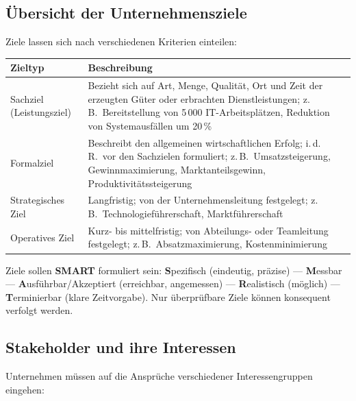 \documentclass[11pt, a4paper]{article}
\begin{document}
\subsection{Übersicht der Unternehmensziele}

Ziele lassen sich nach verschiedenen Kriterien einteilen:

\begin{center}
\begin{tabular}{p{3.5cm} p{9.5cm}}
\toprule
\textbf{Zieltyp} & \textbf{Beschreibung}\\
\midrule
Sachziel (Leistungsziel) & Bezieht sich auf Art, Menge, Qualität, Ort und Zeit der erzeugten
Güter oder erbrachten Dienstleistungen; z.\,B.\ Bereitstellung von
5\,000 IT-Arbeitsplätzen, Reduktion von Systemausfällen um 20\,\%\\
\addlinespace
Formalziel & Beschreibt den allgemeinen wirtschaftlichen Erfolg; i.\,d.\,R.\ vor den
Sachzielen formuliert; z.\,B.\ Umsatzsteigerung, Gewinnmaximierung,
Marktanteilsgewinn, Produktivitätssteigerung\\
\addlinespace
Strategisches Ziel & Langfristig; von der Unternehmensleitung festgelegt;
z.\,B.\ Technologieführerschaft, Marktführerschaft\\
\addlinespace
Operatives Ziel & Kurz- bis mittelfristig; von Abteilungs- oder Teamleitung festgelegt;
z.\,B.\ Absatzmaximierung, Kostenminimierung\\
\bottomrule
\end{tabular}
\end{center}

\begin{merksatz}[title={\bfseries Zielformulierung nach der SMART-Formel}]
Ziele sollen \textbf{SMART} formuliert sein: \textbf{S}pezifisch (eindeutig, präzise) ---
\textbf{M}essbar --- \textbf{A}usführbar/Akzeptiert (erreichbar, angemessen) ---
\textbf{R}ealistisch (möglich) --- \textbf{T}erminierbar (klare Zeitvorgabe). Nur überprüfbare
Ziele können konsequent verfolgt werden.
\end{merksatz}

\subsection{Stakeholder und ihre Interessen}

Unternehmen müssen auf die Ansprüche verschiedener Interessengruppen eingehen:
\end{document}
